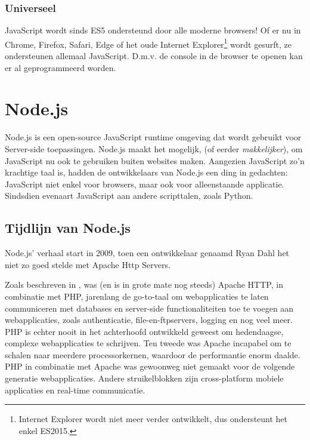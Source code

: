 \subsubsection{Universeel}
\label{sec:universal}

JavaScript wordt sinds ES5 ondersteund door alle moderne browsers! Of er nu in Chrome, Firefox, Safari, Edge of het oude Internet Explorer\footnote{Internet Explorer wordt niet meer verder ontwikkelt, dus ondersteunt het enkel ES2015.} wordt gesurft, ze ondersteunen allemaal JavaScript. D.m.v. de console in de browser te openen kan er al geprogrammeerd worden.





\section{Node.js}
\label{sec:nodeJs}

Node.js is een open-source JavaScript runtime omgeving dat wordt gebruikt voor Server-side toepassingen. Node.js maakt het mogelijk, (of eerder \textit{makkelijker}), om JavaScript nu ook te gebruiken buiten websites maken. Aangezien JavaScript zo'n krachtige taal is, hadden de ontwikkelaars van Node.js een ding in gedachten: JavaScript niet enkel voor browsers, maar ook voor alleenstaande applicatie. Sindsdien evenaart JavaScript aan andere scripttalen, zoals Python. \textcite{Patel2018}

\subsection{Tijdlijn van Node.js}
\label{sec:nodeTimeline}
Node.js' verhaal start in 2009, toen een ontwikkelaar genaamd Ryan Dahl het niet zo goed stelde met Apache Http Servers. 

Zoals beschreven in \autocite{Chaniotis2015}, was (en is in grote mate nog steeds) Apache HTTP, in combinatie met PHP, jarenlang de go-to-taal om webapplicaties te laten communiceren met databases en server-side functionaliteiten toe te voegen aan webapplicaties, zoals authenticatie, file-en-ftpservers, logging en nog veel meer. PHP is echter nooit in het achterhoofd ontwikkeld geweest om hedendaagse, complexe webapplicaties te schrijven. Ten tweede was Apache incapabel om te schalen naar meerdere processorkernen, waardoor de performantie enorm daalde. PHP in combinatie met Apache was gewoonweg niet gemaakt voor de volgende generatie webapplicaties. Andere struikelblokken zijn cross-platform mobiele applicaties en real-time communicatie.

